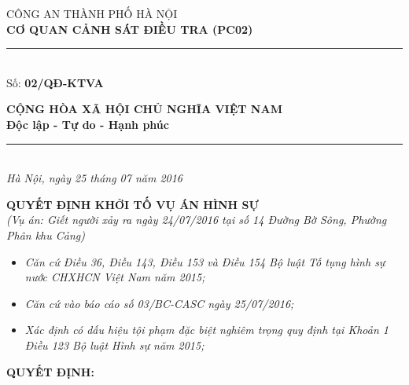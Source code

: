 \documentclass[12pt,a4paper]{article}
\begin{document}
\noindent
\begin{minipage}[t]{0.46\textwidth}
    \begin{center}
        \fontsize{11pt}{13pt}\selectfont
        CÔNG AN THÀNH PHỐ HÀ NỘI\\
        \textbf{CƠ QUAN CẢNH SÁT ĐIỀU TRA (PC02)}\\[-0.2em]
        \rule{3.2cm}{0.6pt}\\[0.25cm]
        \fontsize{11pt}{13pt}\selectfont Số: \textbf{02/QĐ-KTVA}
    \end{center}
\end{minipage}
\hfill
\begin{minipage}[t]{0.52\textwidth}
    \begin{center}
        \fontsize{11pt}{13pt}\selectfont
        \textbf{CỘNG HÒA XÃ HỘI CHỦ NGHĨA VIỆT NAM}\\
        \textbf{Độc lập - Tự do - Hạnh phúc}\\[-0.2em]
        \rule{3.6cm}{0.6pt}\\[0.25cm]
        \textit{Hà Nội, ngày 25 tháng 07 năm 2016}
    \end{center}
\end{minipage}

\vspace{0.5cm}

\begin{center}
    \textbf{\Large QUYẾT ĐỊNH KHỞI TỐ VỤ ÁN HÌNH SỰ}\\[0.15cm]
    \textit{(Vụ án: Giết người xảy ra ngày 24/07/2016 tại số 14 Đường Bờ Sông, Phường Phân khu Cảng)}
\end{center}

\vspace{0.3cm}


\begin{itemize}[leftmargin=*, itemsep=2pt, topsep=2pt, parsep=0pt]
  \item \textit{Căn cứ Điều 36, Điều 143, Điều 153 và Điều 154 Bộ luật Tố tụng hình sự nước CHXHCN Việt Nam năm 2015;}
  \item \textit{Căn cứ vào báo cáo số 03/BC-CASC ngày 25/07/2016;}
  \item \textit{Xác định có dấu hiệu tội phạm đặc biệt nghiêm trọng quy định tại Khoản 1 Điều 123 Bộ luật Hình sự năm 2015;}

\end{itemize}

\vspace{0.3cm}\noindent\textbf{\large QUYẾT ĐỊNH:}\\[0.15cm]
\end{document}
